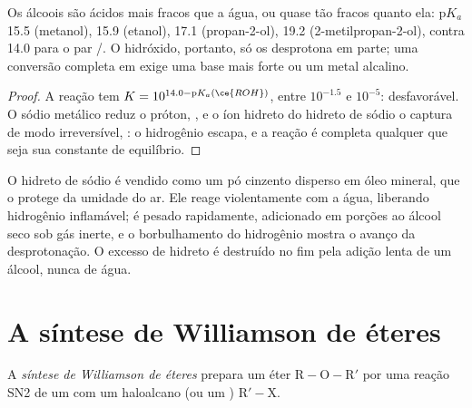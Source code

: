 \begin{proposition}\label{prop:b1:alcohol-activation:alcohol-acidity}
Os álcoois são ácidos mais fracos que a água, ou quase tão fracos quanto ela: $\mathrm{p}K_a$
15.5 (metanol), 15.9 (etanol), 17.1 (propan-2-ol), 19.2
(2-metilpropan-2-ol), contra 14.0 para o par /.
O hidróxido, portanto, só os desprotona em parte; uma conversão completa
em  exige uma base mais forte ou um metal alcalino.
\end{proposition}

\begin{proof}
A reação  tem $K = 10^{14.0 -
\mathrm{p}K_a(\ce{ROH})}$, entre $10^{-1.5}$ e $10^{-5}$: desfavorável.
O sódio metálico reduz o próton, , e
o íon hidreto do hidreto de sódio o captura de modo irreversível,
: o hidrogênio escapa, e a reação é
completa qualquer que seja sua constante de equilíbrio.
\end{proof}

\begin{inthelab}
O hidreto de sódio é vendido como um pó cinzento disperso em óleo mineral,
que o protege da umidade do ar. Ele reage violentamente com a água,
liberando hidrogênio inflamável; é pesado rapidamente, adicionado em porções
ao álcool seco sob gás inerte, e o borbulhamento do hidrogênio mostra o
avanço da desprotonação. O excesso de hidreto é destruído no fim pela
adição lenta de um álcool, nunca de água.
\end{inthelab}

\section{A síntese de Williamson de éteres}

\begin{definition}\label{def:b1:alcohol-activation:williamson}
A \emph{síntese de Williamson de éteres}
prepara um éter $\mathrm{R{-}O{-}R'}$ por uma reação SN2 de um  
com um haloalcano (ou um ) $\mathrm{R'{-}X}$.
\end{definition}

